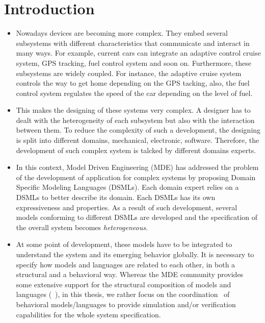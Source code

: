 \chapter{Introduction}


\begin{itemize}
	\item Nowadays devices are becoming more complex. They embed several subsystems with different characteristics that communicate and interact in many ways. For example, current cars can integrate an adaptive control cruise system, GPS tracking, fuel control system and soon on. Furthermore, these subsystems are widely coupled. For instance, the adaptive cruise system controls the way to get home depending on the GPS tacking, also, the fuel control system regulates the speed of the car depending on the level of fuel.
	
	\item This makes the designing of these systems very complex. A designer has to dealt with the heterogeneity of each subsystem but also with the interaction between them. To reduce the complexity of such a development, the designing is split into different domains, \eg mechanical, electronic, software. Therefore, the development of such complex system is talcked by different domains experts.
	
	\item In this context, Model Driven Engineering (MDE) has addressed the problem of the development of application for complex systems by proposing Domain Specific Modeling Languages (DSMLs). Each domain expert relies on a DSMLs to better describe its domain. Each DSMLs has its own expressiveness and properties. As a result of such development, several models conforming to different DSMLs are developed and the specification of the overall system becomes \emph{heterogeneous}.
	\item At some point of development, these models have to be integrated to understand the system and its emerging behavior globally. It is necessary to specify how models and languages are related to each other, in both a structural and a behavioral way. Whereas the MDE community provides some extensive support for the structural composition of models and languages (\eg~\cite{kompose,epsilon}), in this thesis, we rather focus on the coordination~\cite{coordsignibib} of behavioral models/languages to provide simulation and/or verification capabilities for the whole system specification. 
	

\end{itemize}
